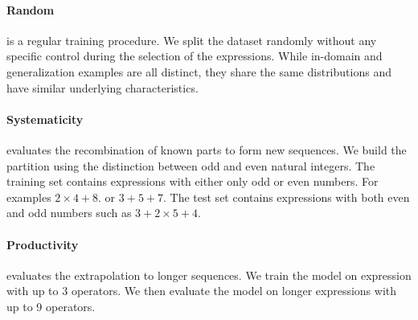

\paragraph{Random} is a regular training procedure. We split the dataset randomly without any specific control during the selection of the expressions. While in-domain and generalization examples are all distinct, they share the same distributions and have similar underlying characteristics.

\paragraph{Systematicity} evaluates the recombination of known parts to form new sequences. We build the partition using the distinction between odd and even natural integers. The training set contains expressions with either only odd or even numbers. For examples $2 \times 4 + 8$. or $3 + 5 + 7$. The test set contains expressions with both even and odd numbers such as $3 + 2 \times 5 + 4$.

\paragraph{Productivity} evaluates the extrapolation to longer sequences. We train the model on expression with up to 3 operators. We then evaluate the model on longer expressions with up to 9 operators.


